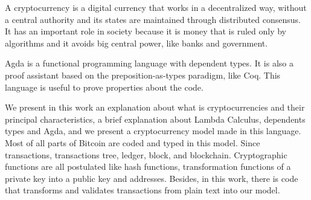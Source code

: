 \subtitle{Abstract}

A cryptocurrency is a digital currency that works in a decentralized way, without a
central authority and its states are maintained through distributed consensus.
It has an important role in society because it is money that is ruled only by algorithms
and it avoids big central power, like banks and government.

Agda is a functional programming language with dependent types.
It is also a proof assistant based on the preposition-as-types paradigm, like Coq.
This language is useful to prove properties about the code.

We present in this work an explanation about what is cryptocurrencies and their principal characteristics,
a brief explanation about Lambda Calculus, dependents types and Agda,
and we present a cryptocurrency model made in this language.
Most of all parts of Bitcoin are coded and typed in this model.
Since transactions, transactions tree, ledger, block, and blockchain.
Cryptographic functions are all postulated like hash functions,
transformation functions of a private key into a public key and addresses.
Besides, in this work, there is code that transforms and validates transactions
from plain text into our model.
